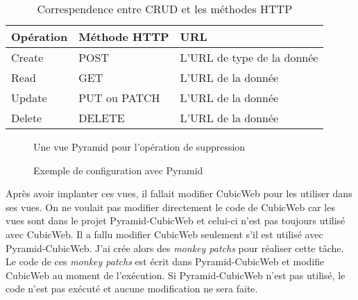     \begin{table}
        \centering
        \begin{tabular}{|>{\centering\arraybackslash}m{}
        					|>{\centering\arraybackslash}m{}
        					|>{\centering\arraybackslash}m{}|}
        \hline
        \cellcolor{Gray} \textbf{Opération} & 
        \cellcolor{Gray} \textbf{Méthode HTTP} &
        \cellcolor{Gray} \textbf{URL} \\ \hline
        Create & POST & L'URL de type de la donnée\\ \hline
        Read   & GET & L'URL de la donnée\\ \hline
        Update & PUT ou PATCH & L'URL de la donnée \\ \hline
        Delete & DELETE & L'URL de la donnée \\ \hline
    \end{tabular}
    \caption{Correspendence entre CRUD et les méthodes HTTP}
    \label{table:crud}
\end{table}


\begin{figure}[htp]
    \centering
    \caption{Une vue Pyramid pour l'opération de suppression}
    \label{fig:delete}
\end{figure}

\begin{figure}[htp]
    \centering
    \caption{Exemple de configuration avec Pyramid}
    \label{fig:figpyramidconf}
\end{figure}



Après avoir implanter ces vues, il fallait modifier CubicWeb pour les utiliser dans ses vues. On ne voulait pas modifier directement le code de CubicWeb car les vues sont dans le projet Pyramid-CubicWeb et celui-ci n'est pas toujours utilisé avec CubicWeb. Il a fallu modifier CubicWeb seulement s'il est utilisé avec Pyramid-CubicWeb. J'ai crée alors des \textit{monkey patchs} pour réaliser cette tâche. Le code de ces \textit{monkey patchs} est écrit dans Pyramid-CubicWeb et modifie CubicWeb au moment de l'exécution. Si Pyramid-CubicWeb n'est pas utilisé, le code n'est pas exécuté et aucune modification ne sera faite.

